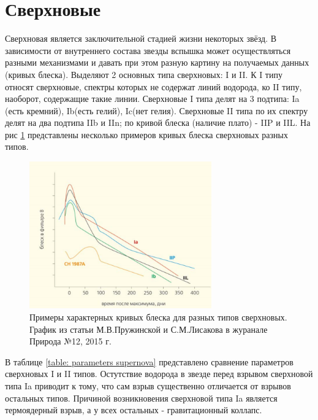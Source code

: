 \documentclass[a4paper,12pt]{extarticle}
\begin{document}
\newpage

\section{Сверхновые} \label{sec: Supernovae}
Сверхновая является заключительной стадией жизни некоторых звёзд.{\cite{Shklov1984}} В зависимости от внутреннего состава звезды вспышка может осуществляться разными механизмами и давать при этом разную картину на получаемых данных (кривых блеска). Выделяют 2 основных типа сверхновых: I и II. К I типу относят сверхновые, спектры которых не содержат линий водорода, ко II типу, наоборот, содержащие такие линии. Сверхновые I типа делят на 3 подтипа: Ia (есть кремний), Ib(есть гелий), Ic(нет гелия). Сверхновые II типа по их спектру делят на два подтипа IIb и IIn; по кривой блеска (наличие плато) - IIP и IIL. На рис \ref{fig:light_curves} представлены несколько примеров кривых блеска сверхновых разных типов. 

\begin{figure}[!htb] 
	\centering
	\includegraphics[width=0.7\textwidth]{Характерные кривые блеска.png}
	\caption{
		Примеры характерных кривых блеска для разных типов сверхновых. График из статьи М.В.Пружинской и С.М.Лисакова в журанале Природа №12, 2015 г.
	}
	\label{fig:light_curves}
\end{figure}

В таблице \ref{table: parameters supernova} представлено сравнение параметров сверхновых I и II типов.  Остутствие водорода в звезде перед взрывом сверхновой типа Ia приводит к тому, что сам взрыв существенно отличается от взрывов остальных типов. Причиной возникновения сверхновой типа Ia является термоядерный взрыв, а у всех остальных - гравитационный коллапс. 
\end{document}
